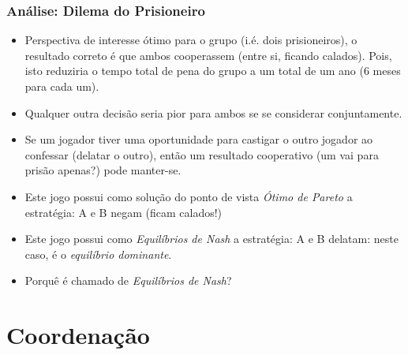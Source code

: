 \begin{frame}
    \frametitle{Análise: Dilema do Prisioneiro}

 \begin{itemize}
  
 
   \item Perspectiva de interesse ótimo para o grupo (i.é. dois prisioneiros), o resultado correto é que  ambos cooperassem (entre si, ficando calados).
   Pois,  isto reduziria o tempo total de pena do grupo a um total de um ano (6 meses para cada um).

   \item  Qualquer outra decisão seria pior para ambos se se considerar conjuntamente.

\item Se um jogador tiver uma oportunidade para castigar o outro jogador ao confessar (delatar o outro), então um resultado cooperativo (um vai para prisão apenas?) pode manter-se.

\pause
   
   
\item Este jogo possui como solução do ponto de vista \textit{Ótimo de Pareto} a estratégia:
A e B negam (ficam calados!)

\pause
   
   
\item Este jogo possui como 
\textit{Equilíbrios de Nash} a estratégia: 
A e B delatam: neste caso, é o \textit{equilíbrio dominante}.

\item Porquê é chamado de \textit{Equilíbrios de Nash}?
     
 \end{itemize}
 
 


\end{frame}




\section{Coordenação}


